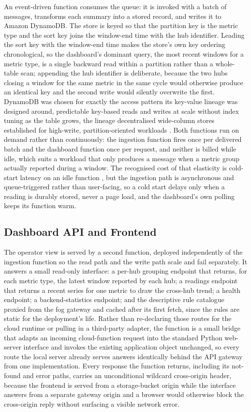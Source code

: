 \documentclass[conference]{IEEEtran}
\begin{document}
An event-driven function consumes the queue: it is invoked with a batch of messages, transforms each summary into a stored record, and writes it to Amazon DynamoDB. The store is keyed so that the partition key is the metric type and the sort key joins the window-end time with the hub identifier. Leading the sort key with the window-end time makes the store's own key ordering chronological, so the dashboard's dominant query, the most recent windows for a metric type, is a single backward read within a partition rather than a whole-table scan; appending the hub identifier is deliberate, because the two hubs closing a window for the same metric in the same cycle would otherwise produce an identical key and the second write would silently overwrite the first. DynamoDB was chosen for exactly the access pattern its key-value lineage was designed around, predictable key-based reads and writes at scale without index tuning as the table grows, the lineage decentralised wide-column stores established for high-write, partition-oriented workloads \cite{ref7}. Both functions run on demand rather than continuously: the ingestion function fires once per delivered batch and the dashboard function once per request, and neither is billed while idle, which suits a workload that only produces a message when a metric group actually reported during a window. The recognised cost of that elasticity is cold-start latency on an idle function \cite{ref8}, but the ingestion path is asynchronous and queue-triggered rather than user-facing, so a cold start delays only when a reading is durably stored, never a page load, and the dashboard's own polling keeps its function warm.

\subsection{Dashboard API and Frontend}

The operator view is served by a second function, deployed independently of the ingestion function so the read path and the write path scale and fail separately. It answers a small read-only interface: a per-hub grouping endpoint that returns, for each metric type, the latest window reported by each hub; a readings endpoint that returns a recent series for one metric to draw the cross-hub trend; a health endpoint; a backend-statistics endpoint; and the descriptive rule catalogue proxied from the fog gateway and cached after its first fetch, since the rules are static for the deployment's life. Rather than re-declaring those routes for the cloud runtime or pulling in a third-party adapter, the function is a small bridge that adapts an incoming cloud-function request into the standard Python web-server interface \cite{ref9} and invokes the existing application object unchanged, so every route the local server already serves answers identically behind the API gateway from one implementation. Every response the function returns, including its not-found and error paths, carries an unconditional wildcard cross-origin header, because the frontend is served from a storage-bucket origin while the interface answers from a separate gateway origin and a browser would otherwise block the cross-origin reply without surfacing a visible network error.
\end{document}
